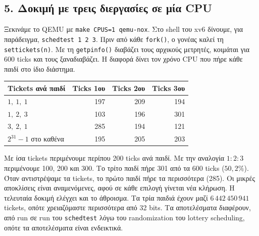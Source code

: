 \documentclass[11pt,a4paper]{article}
\begin{document}


\clearpage
\subsection*{5. Δοκιμή με τρεις διεργασίες σε μία CPU}
Ξεκινάμε το QEMU με \texttt{make CPUS=1 qemu-nox}. Στο shell του xv6 δίνουμε, για παράδειγμα, \texttt{schedtest 1 2 3}. Πριν από κάθε \texttt{fork()}, ο γονέας καλεί τη \texttt{settickets(n)}. Με τη \texttt{getpinfo()} διαβάζει τους αρχικούς μετρητές, κοιμάται για 600 ticks και τους ξαναδιαβάζει. Η διαφορά δίνει τον χρόνο CPU που πήρε κάθε παιδί στο ίδιο διάστημα.

\begin{center}
\begin{tabular}{@{}lrrr@{}}
\toprule
Tickets ανά παιδί & Ticks 1ου & Ticks 2ου & Ticks 3ου \\
\midrule
$1,\ 1,\ 1$ & 197 & 209 & 194 \\
$1,\ 2,\ 3$ & 103 & 196 & 301 \\
$3,\ 2,\ 1$ & 285 & 194 & 121 \\
$2^{31}-1$ στο καθένα & 195 & 205 & 203 \\
\bottomrule
\end{tabular}
\end{center}

Με ίσα tickets περιμένουμε περίπου 200 ticks ανά παιδί. 
Με την αναλογία $1:2:3$ περιμένουμε 100, 200 και 300. 
Το τρίτο παιδί πήρε 301 από τα 600 ticks ($50{,}2\%$). 
Όταν αντιστρέψαμε τα tickets, το πρώτο παιδί πήρε τα περισσότερα (285). 
Οι μικρές αποκλίσεις είναι αναμενόμενες, αφού σε κάθε επιλογή γίνεται νέα κλήρωση. 
Η τελευταία δοκιμή ελέγχει και το άθροισμα. 
Τα τρία παιδιά έχουν μαζί $6\,442\,450\,941$ tickets, οπότε χρειαζόμαστε περισσότερα από 32 bits.
Τα αποτελέσματα διαφέρουν, από run σε run του \texttt{schedtest} λόγω του randomization του lottery scheduling, οπότε τα αποτελέσματα είναι ενδεικτικά.
\end{document}
